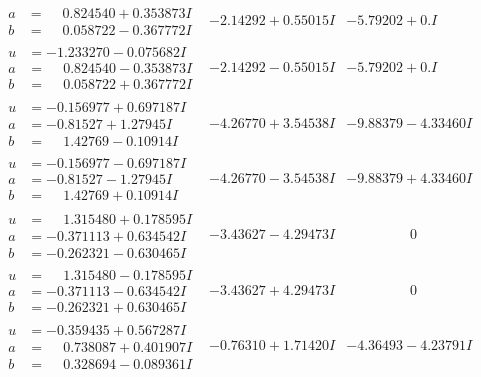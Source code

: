 \documentclass[1p]{elsarticle_modified}
\theoremstyle{definition}
\begin{document}
$$\begin{array}{c|c|c}
\begin{aligned}
a &= \phantom{-}0.824540 + 0.353873 I \\
b &= \phantom{-}0.058722 - 0.367772 I\end{aligned}
 & -2.14292 + 0.55015 I & -5.79202 + 0. I\phantom{ +0.000000I} \\ \hline\begin{aligned}
u &= -1.233270 - 0.075682 I \\
a &= \phantom{-}0.824540 - 0.353873 I \\
b &= \phantom{-}0.058722 + 0.367772 I\end{aligned}
 & -2.14292 - 0.55015 I & -5.79202 + 0. I\phantom{ +0.000000I} \\ \hline\begin{aligned}
u &= -0.156977 + 0.697187 I \\
a &= -0.81527 + 1.27945 I \\
b &= \phantom{-}1.42769 - 0.10914 I\end{aligned}
 & -4.26770 + 3.54538 I & -9.88379 - 4.33460 I \\ \hline\begin{aligned}
u &= -0.156977 - 0.697187 I \\
a &= -0.81527 - 1.27945 I \\
b &= \phantom{-}1.42769 + 0.10914 I\end{aligned}
 & -4.26770 - 3.54538 I & -9.88379 + 4.33460 I \\ \hline\begin{aligned}
u &= \phantom{-}1.315480 + 0.178595 I \\
a &= -0.371113 + 0.634542 I \\
b &= -0.262321 - 0.630465 I\end{aligned}
 & -3.43627 - 4.29473 I & \phantom{-0.000000 } 0 \\ \hline\begin{aligned}
u &= \phantom{-}1.315480 - 0.178595 I \\
a &= -0.371113 - 0.634542 I \\
b &= -0.262321 + 0.630465 I\end{aligned}
 & -3.43627 + 4.29473 I & \phantom{-0.000000 } 0 \\ \hline\begin{aligned}
u &= -0.359435 + 0.567287 I \\
a &= \phantom{-}0.738087 + 0.401907 I \\
b &= \phantom{-}0.328694 - 0.089361 I\end{aligned}
 & -0.76310 + 1.71420 I & -4.36493 - 4.23791 I \\ \hline\begin{aligned}

\end{aligned}
\end{array}$$
\end{document}
